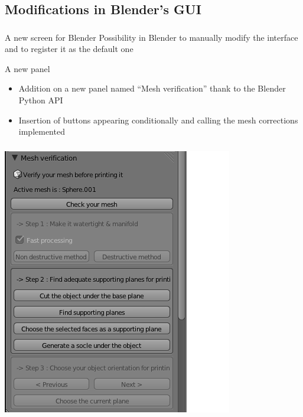 \documentclass{beamer}
\begin{document}
\subsection{Modifications in Blender's GUI}
\begin{frame}
	\frametitle{}

    \begin{block}{A new screen for Blender}
Possibility in Blender to manually modify the interface and to register it as the default one
    \end{block}
    
    \begin{block}{A new panel}
    \begin{itemize}
	\item Addition on a new panel named “Mesh verification” thank to the Blender Python API
	\item Insertion of buttons appearing conditionally and calling the mesh corrections implemented
	\end{itemize}
    \end{block}
\end{frame}

\begin{frame}
	\frametitle{}
    \begin{center}
		\includegraphics[height=.9\textheight]{Panel}
	\end{center}
\end{frame}
\end{document}
